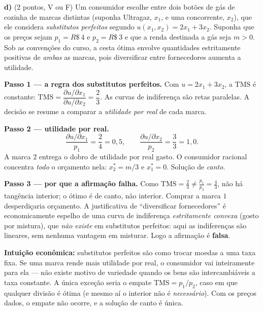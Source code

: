 \textbf{d)} (2 pontos, V ou F) Um consumidor escolhe entre dois botões de gás de cozinha de marcas distintas (suponha Ultragaz, $x_1$, e uma concorrente, $x_2$), que ele considera \emph{substitutos perfeitos} segundo $u(x_1,x_2)=2x_1+3x_2$. Suponha que os preços sejam $p_1=R\$~4$ e $p_2=R\$~3$ e que a renda destinada a gás seja $m>0$. Sob as convenções do curso, a cesta ótima envolve quantidades estritamente positivas de \emph{ambas} as marcas, pois diversificar entre fornecedores aumenta a utilidade.

\begin{solucao}
\textbf{Passo 1 --- a regra dos substitutos perfeitos.} Com $u=2x_1+3x_2$, a $\text{TMS}$ é constante: $\text{TMS}=\dfrac{\partial u/\partial x_1}{\partial u/\partial x_2}=\dfrac{2}{3}$. As curvas de indiferença são retas paralelas. A decisão se resume a comparar a \emph{utilidade por real} de cada marca.

\textbf{Passo 2 --- utilidade por real.} 
\[
\frac{\partial u/\partial x_1}{p_1}=\frac{2}{4}=0{,}5,\qquad \frac{\partial u/\partial x_2}{p_2}=\frac{3}{3}=1{,}0.
\]
A marca $2$ entrega o dobro de utilidade por real gasto. O consumidor racional concentra \emph{todo} o orçamento nela: $x_2^{*}=m/3$ e $x_1^{*}=0$. Solução de \emph{canto}.

\textbf{Passo 3 --- por que a afirmação falha.} Como $\text{TMS}=\tfrac23\neq \tfrac{p_1}{p_2}=\tfrac43$, não há tangência interior; o ótimo é de canto, não interior. Comprar a marca $1$ desperdiçaria orçamento. A justificativa de ``diversificar fornecedores'' é economicamente espelho de uma curva de indiferença \emph{estritamente convexa} (gosto por mistura), que \emph{não existe} em substitutos perfeitos: aqui as indiferenças são lineares, sem nenhuma vantagem em misturar. Logo a afirmação é \textbf{falsa}.

\textbf{Intuição econômica:} substitutos perfeitos são como trocar moedas a uma taxa fixa. Se uma marca rende mais utilidade por real, o consumidor vai inteiramente para ela --- não existe motivo de variedade quando os bens são intercambiáveis a taxa constante. A única exceção seria o empate $\text{TMS}=p_1/p_2$, caso em que qualquer divisão é ótima (e mesmo aí o interior não é \emph{necessário}). Com os preços dados, o empate não ocorre, e a solução de canto é única.
\end{solucao}

